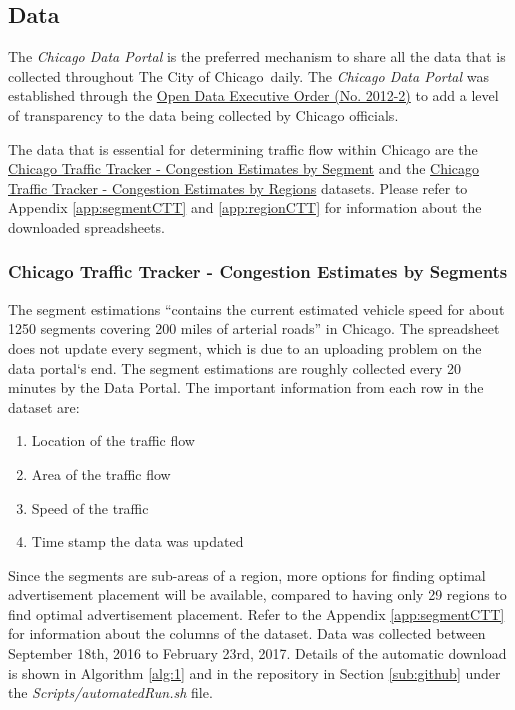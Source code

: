 \documentclass[titlepage,twocolumn]{article}
\newcommand{\CityChicago}{City of Chicago}
\begin{document}
\subsection{Data}
\label{sub:Data}

\par The \textit{Chicago Data Portal} is the preferred mechanism to share all the data that is collected throughout The \CityChicago\ daily. The \textit{Chicago Data Portal} was established through the \href{https://www.cityofchicago.org/city/en/narr/foia/open_data_executiveorder.html}{Open Data Executive Order (No. 2012-2)} to add a level of transparency to the data being collected by Chicago officials. 

\par The data that is essential for determining traffic flow within Chicago are the
\href{https://data.cityofchicago.org/Transportation/Chicago-Traffic-Tracker-Congestion-Estimates-by-Se/n4j6-wkkf}{Chicago Traffic Tracker - Congestion Estimates by Segment} and the  \href{https://data.cityofchicago.org/Transportation/Chicago-Traffic-Tracker-Congestion-Estimates-by-Re/t2qc-9pjd}{Chicago Traffic Tracker - Congestion Estimates by Regions} datasets. Please refer to Appendix \ref{app:segmentCTT} and \ref{app:regionCTT} for information about the downloaded spreadsheets.

\subsubsection{Chicago Traffic Tracker - Congestion Estimates by Segments}

\par The segment estimations “contains the current estimated vehicle speed for about 1250 segments covering 200 miles of arterial roads” \cite{S1} in Chicago. The spreadsheet does not update every segment, which is due to an uploading problem on the data portal`s end. The segment estimations are roughly collected every 20 minutes by the Data Portal. The important information from each row in the dataset are:
\begin{enumerate}
	\item Location of the traffic flow
	\item Area of the traffic flow
	\item Speed of the traffic
	\item Time stamp the data was updated
\end{enumerate}

\par Since the segments are sub-areas of a region, more options for finding optimal advertisement placement will be available, compared to having only 29 regions to find optimal advertisement placement. Refer to the Appendix \ref{app:segmentCTT} for information about the columns of the dataset. Data was collected between September 18th, 2016 to February 23rd, 2017. Details of the automatic download is shown in Algorithm \ref{alg:1} and in the repository in Section \ref{sub:github} under the \textit{Scripts/automatedRun.sh} file.
\end{document}
